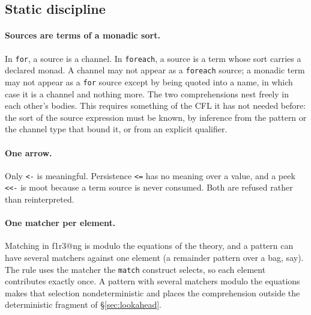 \documentclass[11pt]{article}
\makeatletter
\theoremstyle{definition}
\theoremstyle{plain}
\theoremstyle{remark}
\newcommand{\fe}{\texttt{foreach}}
\newcommand{\flang}{\textsf{f1r3\textbar @ng}}
\makeatother
\begin{document}
\subsection{Static discipline}
\label{sec:static}

\paragraph{Sources are terms of a monadic sort.} In \texttt{for}, a source is a
channel. In \fe{}, a source is a term whose sort carries a declared monad. A
channel may not appear as a \fe{} source; a monadic term may not appear as a
\texttt{for} source except by being quoted into a name, in which case it is a
channel and nothing more. The two comprehensions nest freely in each other's
bodies. This requires something of the CFL it has not needed before: the sort
of the source expression must be known, by inference from the pattern or the
channel type that bound it, or from an explicit qualifier.

\paragraph{One arrow.} Only \texttt{<-} is meaningful. Persistence \texttt{<=}
has no meaning over a value, and a peek \texttt{<<-} is moot because a term
source is never consumed. Both are refused rather than reinterpreted.

\paragraph{One matcher per element.} Matching in \flang{} is modulo the
equations of the theory, and a pattern can have several matchers against one
element (a remainder pattern over a bag, say). The rule uses the matcher the
\texttt{match} construct selects, so each element contributes exactly once. A
pattern with several matchers modulo the equations makes that selection
nondeterministic and places the comprehension outside the deterministic
fragment of \S\ref{sec:lookahead}.
\end{document}
